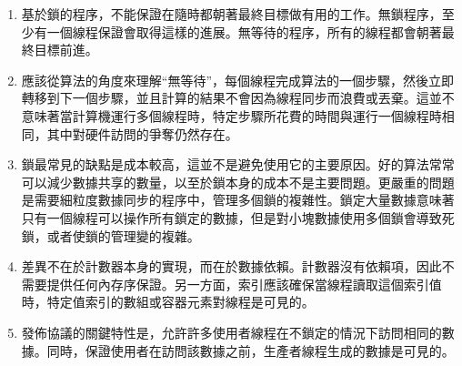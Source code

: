 \begin{enumerate}
\item 
基於鎖的程序，不能保證在隨時都朝著最終目標做有用的工作。無鎖程序，至少有一個線程保證會取得這樣的進展。無等待的程序，所有的線程都會朝著最終目標前進。

\item 
應該從算法的角度來理解“無等待”，每個線程完成算法的一個步驟，然後立即轉移到下一個步驟，並且計算的結果不會因為線程同步而浪費或丟棄。這並不意味著當計算機運行多個線程時，特定步驟所花費的時間與運行一個線程時相同，其中對硬件訪問的爭奪仍然存在。

\item 
鎖最常見的缺點是成本較高，這並不是避免使用它的主要原因。好的算法常常可以減少數據共享的數量，以至於鎖本身的成本不是主要問題。更嚴重的問題是需要細粒度數據同步的程序中，管理多個鎖的複雜性。鎖定大量數據意味著只有一個線程可以操作所有鎖定的數據，但是對小塊數據使用多個鎖會導致死鎖，或者使鎖的管理變的複雜。

\item
差異不在於計數器本身的實現，而在於數據依賴。計數器沒有依賴項，因此不需要提供任何內存序保證。另一方面，索引應該確保當線程讀取這個索引值時，特定值索引的數組或容器元素對線程是可見的。

\item
發佈協議的關鍵特性是，允許許多使用者線程在不鎖定的情況下訪問相同的數據。同時，保證使用者在訪問該數據之前，生產者線程生成的數據是可見的。

\end{enumerate}